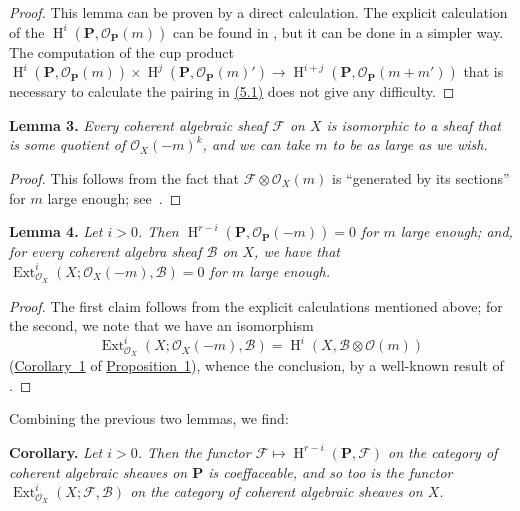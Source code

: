 \documentclass{article}
\newenvironment{itenv}[1]
  {\phantomsection\par\medskip\noindent\textbf{#1.}\itshape}
  {\medskip}
\newcommand{\scr}[1]{{\mathscr{#1}}}
\newcommand{\bb}{\mathbf}
\DeclareMathOperator{\Ext}{Ext}
\DeclareMathOperator{\HH}{H}
\begin{document}
\begin{proof}
  This lemma can be proven by a direct calculation.
  The explicit calculation of the $\HH^i(\bb{P},\scr{O}_\bb{P}(m))$ can be found in \cite{3}, but it can be done in a simpler way.
  The computation of the cup product $\HH^i(\bb{P},\scr{O}_\bb{P}(m))\times\HH^j(\bb{P},\scr{O}_\bb{P}(m)') \to \HH^{i+j}(\bb{P},\scr{O}_\bb{P}(m+m'))$ that is necessary to calculate the pairing in \hyperref[5.1]{(5.1)} does not give any difficulty.
\end{proof}

\begin{itenv}{Lemma 3}
\label{lemma3}
  Every coherent algebraic sheaf $\scr{F}$ on $X$ is isomorphic to a sheaf that is some quotient of $\scr{O}_X(-m)^k$, and we can take $m$ to be as large as we wish.
\end{itenv}

\begin{proof}
  This follows from the fact that $\scr{F}\otimes\scr{O}_X(m)$ is ``generated by its sections'' for $m$ large enough; see~\cite{3}.
\end{proof}

\begin{itenv}{Lemma 4}
\label{lemma4}
  Let $i>0$.
  Then $\HH^{r-i}(\bb{P},\scr{O}_\bb{P}(-m))=0$ for $m$ large enough;
  and, for every coherent algebra sheaf $\scr{B}$ on $X$, we have that $\Ext_{\scr{O}_X}^i(X;\scr{O}_X(-m),\scr{B})=0$ for $m$ large enough.
\end{itenv}

\begin{proof}
  The first claim follows from the explicit calculations mentioned above;
  for the second, we note that we have an isomorphism
  \[
    \Ext_{\scr{O}_X}^i(X;\scr{O}_X(-m),\scr{B}) = \HH^i(X,\scr{B}\otimes\scr{O}(m))
  \]
  (\hyperref[proposition1corollary1]{Corollary~1} of \hyperref[proposition1]{Proposition~1}), whence the conclusion, by a well-known result of \cite{3}.
\end{proof}

Combining the previous two lemmas, we find:

\begin{itenv}{Corollary}
\label{lemma3andlemma4corollary}
  Let $i>0$.
  Then the functor $\scr{F}\mapsto\HH^{r-i}(\bb{P},\scr{F})$ on the category of coherent algebraic sheaves on $\bb{P}$ is coeffaceable, and so too is the functor $\Ext_{\scr{O}_X}^i(X;\scr{F},\scr{B})$ on the category of coherent algebraic sheaves on $X$.
\end{itenv}
\end{document}
